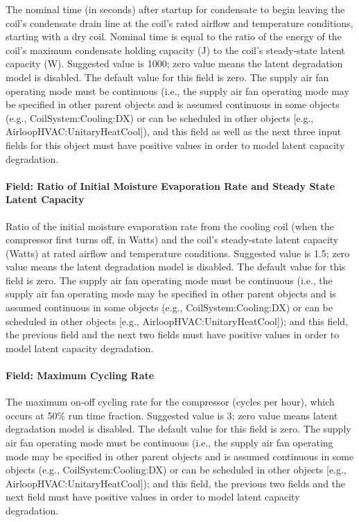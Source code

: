 The nominal time (in seconds) after startup for condensate to begin leaving the coil's condensate drain line at the coil's rated airflow and temperature conditions, starting with a dry coil. Nominal time is equal to the ratio of the energy of the coil's maximum condensate holding capacity (J) to the coil's steady-state latent capacity (W). Suggested value is 1000; zero value means the latent degradation model is disabled. The default value for this field is zero. The supply air fan operating mode must be continuous (i.e., the supply air fan operating mode may be specified in other parent objects and is assumed continuous in some objects (e.g., CoilSystem:Cooling:DX) or can be scheduled in other objects {[}e.g., AirloopHVAC:UnitaryHeatCool{]}), and this field as well as the next three input fields for this object must have positive values in order to model latent capacity degradation.

\paragraph{Field: Ratio of Initial Moisture Evaporation Rate and Steady State Latent Capacity}\label{field-ratio-of-initial-moisture-evaporation-rate-and-steady-state-latent-capacity}

Ratio of the initial moisture evaporation rate from the cooling coil (when the compressor first turns off, in Watts) and the coil's steady-state latent capacity (Watts) at rated airflow and temperature conditions. Suggested value is 1.5; zero value means the latent degradation model is disabled. The default value for this field is zero. The supply air fan operating mode must be continuous (i.e., the supply air fan operating mode may be specified in other parent objects and is assumed continuous in some objects (e.g., CoilSystem:Cooling:DX) or can be scheduled in other objects {[}e.g., AirloopHVAC:UnitaryHeatCool{]}); and this field, the previous field and the next two fields must have positive values in order to model latent capacity degradation.

\paragraph{Field: Maximum Cycling Rate}\label{field-maximum-cycling-rate}

The maximum on-off cycling rate for the compressor (cycles per hour), which occurs at 50\% run time fraction. Suggested value is 3; zero value means latent degradation model is disabled. The default value for this field is zero. The supply air fan operating mode must be continuous (i.e., the supply air fan operating mode may be specified in other parent objects and is assumed continuous in some objects (e.g., CoilSystem:Cooling:DX) or can be scheduled in other objects {[}e.g., AirloopHVAC:UnitaryHeatCool{]}); and this field, the previous two fields and the next field must have positive values in order to model latent capacity degradation.

